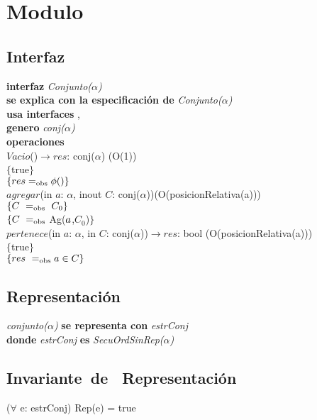 \section*{Modulo }

\subsection*{Interfaz}
\textbf{interfaz} \textit{Conjunto($\alpha$)}\\
\textbf{se explica con la especificaci\'on de} \textit{Conjunto($\alpha$)}\\
\textbf{usa interfaces} , \\
\textbf{genero} \textit{conj($\alpha$)}\\

\textbf{operaciones}\\

$Vacio$()$\longrightarrow res$: conj($\alpha$) \hfill (O(1)) \\
$\{$true$\}$\\
$\{{res} =_{\mathrm{obs}} \phi()\}$\\

$agregar$(in $a$: $\alpha$, inout $C$: conj($\alpha$))\hfill (O(posicionRelativa(a))) \\
$\{\sombreritoWide{C}\ \igobs\ C_0\}$\\
$\{{C}\ =_{\mathrm{obs}}$ Ag(${a}$,$C_0$)$\}$\\

$pertenece$(in $a$: $\alpha$, in $C$: conj($\alpha$))$\longrightarrow res$: bool \hfill (O(posicionRelativa(a))) \\
$\{$true$\}$\\
$\{{res}\ =_{\mathrm{obs}} {a}\in {C}\}$\\

\subsection*{Representaci\'on}
\textit{conjunto($\alpha$)} \textbf{se representa con} \textit{estrConj}\\
\textbf{donde} \textit{estrConj} \textbf{es} \textit{SecuOrdSinRep($\alpha$)}\\

\subsection*{Invariante\ de \ Representaci\'on}
\vspace{11pt}
($\forall$ e: estrConj) Rep(e) = true
\vspace{33pt}

